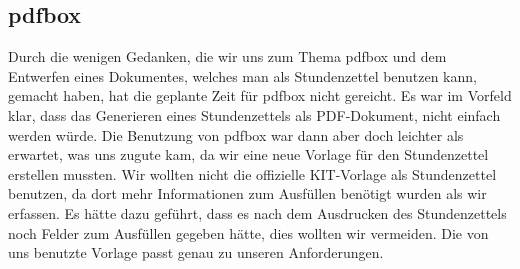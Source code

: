 \subsection{pdfbox} %
Durch die wenigen Gedanken, die wir uns zum Thema pdfbox und dem Entwerfen eines Dokumentes, welches man als Stundenzettel benutzen kann, gemacht haben, hat die geplante Zeit für pdfbox nicht gereicht. Es war im Vorfeld klar, dass das Generieren eines Stundenzettels als PDF-Dokument, nicht einfach werden würde.
Die Benutzung von pdfbox war dann aber doch leichter als erwartet, was uns zugute kam, da wir eine neue Vorlage für den Stundenzettel erstellen mussten. Wir wollten nicht die offizielle KIT-Vorlage als Stundenzettel benutzen, da dort mehr Informationen zum Ausfüllen benötigt wurden als wir erfassen. Es hätte dazu geführt, dass es nach dem Ausdrucken des Stundenzettels noch Felder zum Ausfüllen gegeben hätte, dies wollten wir vermeiden. Die von uns benutzte Vorlage passt genau zu unseren Anforderungen.

